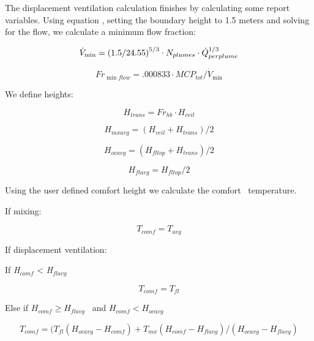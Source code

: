 The displacement ventilation calculation finishes by calculating some report variables. Using equation , setting the boundary height to 1.5 meters and solving for the flow, we calculate a minimum flow fraction:

\begin{equation}
{\dot V_{\min }} = {(1.5/{\rm{24}}{\rm{.55)}}^{{\rm{5/3}}}} \cdot {N_{plumes}} \cdot \dot Q_{perplume}^{1/3}
\end{equation}

\begin{equation}
F{r_{\min flow}} = .000833 \cdot MC{P_{tot}}/{\dot V_{\min }}
\end{equation}

We define heights:

\begin{equation}
{H_{trans}} = F{r_{hb}} \cdot {H_{ceil}}
\end{equation}

\begin{equation}
{H_{mxavg}} = ({H_{ceil}} + {H_{trans}})/2
\end{equation}

\begin{equation}
{H_{ocavg}} = ({H_{fltop}} + {H_{trans}})/2
\end{equation}

\begin{equation}
{H_{flavg}} = {H_{fltop}}/2
\end{equation}

Using the user defined comfort height we calculate the comfort~ temperature.

If mixing:

\begin{equation}
{T_{comf}} = {T_{avg}}
\end{equation}

If displacement ventilation:

If \emph{H\(_{comf}\)} \textless{} \emph{H\(_{flavg}\)}

\begin{equation}
{T_{comf}} = {T_{fl}}
\end{equation}

Else if \({H_{comf}} \ge {H_{flavg}}\) ~and \({H_{comf}} < {H_{ocavg}}\)

\begin{equation}
{T_{comf}} = ({T_{fl}}({H_{ocavg}} - {H_{comf}}) + {T_{mx}}({H_{comf}} - {H_{flavg}})/({H_{ocavg}} - {H_{flavg}})
\end{equation}

